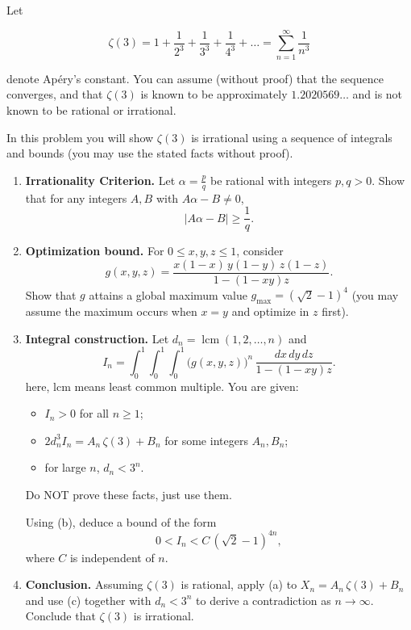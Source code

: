 \begin{problem}

Let 




\begin{equation*}
\zeta(3) 
= 1 + \frac{1}{2^3} + \frac{1}{3^3} + \frac{1}{4^3} + \dots 
= \sum_{n=1}^{\infty} \frac{1}{n^3} 
\end{equation*}

denote Ap\'ery's constant. 
You can assume (without proof) that the sequence converges, and that
$\zeta(3)$ is known to be approximately $1.2020569\dots$ and 
is not known to be rational or irrational.

In this problem you will show $\zeta(3)$ is irrational using a sequence of integrals and bounds 
(you may use the stated facts without proof).

\begin{enumerate}
    \item[(a)] \textbf{Irrationality Criterion.} Let $\alpha=\tfrac{p}{q}$ be rational with integers $p,q>0$. Show that for any integers $A,B$ with $A\alpha-B\ne 0$,
    \[ |A\alpha - B| \ge \frac{1}{q}. \]

    \item[(b)] \textbf{Optimization bound.} For $0\le x,y,z\le 1$, consider
    \[ g(x,y,z) = \frac{x(1-x)\,y(1-y)\,z(1-z)}{1-(1-xy)z}. \]
    Show that $g$ attains a global maximum value $g_{\max}=(\sqrt{2}-1)^4$ (you may assume the maximum occurs when $x=y$ and optimize in $z$ first).

    \item[(c)] \textbf{Integral construction.} Let $d_n=\operatorname{lcm}(1,2,\dots,n)$ and
    \[ I_n = \int_0^1\!\int_0^1\!\int_0^1 \Big( g(x,y,z) \Big)^n \, \frac{dx\,dy\,dz}{1-(1-xy)z}. \]
    here, lcm means least common multiple.
    You are given: 
    

    \begin{itemize}
        \item $I_n>0$ for all $n\ge 1$; 
        \item $2d_n^3 I_n = A_n\,\zeta(3) + B_n$ for some integers $A_n,B_n$; 
        \item for large $n$, $d_n<3^n$.
    \end{itemize}
    Do NOT prove these facts, just use them.

    Using (b), deduce a bound of the form
    \[ 0 < I_n < C\,(\sqrt{2}-1)^{4n}, \]
    where $C$ is independent of $n$.

    \item[(d)] \textbf{Conclusion.} Assuming $\zeta(3)$ is rational, apply (a) to $X_n=A_n\,\zeta(3)+B_n$ and use (c) together with $d_n<3^n$ to derive a contradiction as $n\to\infty$. Conclude that $\zeta(3)$ is irrational.
\end{enumerate}

\end{problem}

